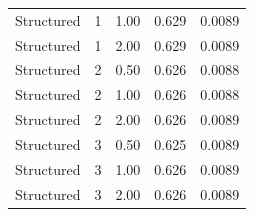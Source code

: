 \begin{tabular}{lrrll}
  Structured &   1 & 1.00 & 0.629 & 0.0089 \\ 
  Structured &   1 & 2.00 & 0.629 & 0.0089 \\ 
  Structured &   2 & 0.50 & 0.626 & 0.0088 \\ 
  Structured &   2 & 1.00 & 0.626 & 0.0088 \\ 
  Structured &   2 & 2.00 & 0.626 & 0.0089 \\ 
  Structured &   3 & 0.50 & 0.625 & 0.0089 \\ 
  Structured &   3 & 1.00 & 0.626 & 0.0089 \\ 
  Structured &   3 & 2.00 & 0.626 & 0.0089 \\ 
   \hline
\end{tabular}
